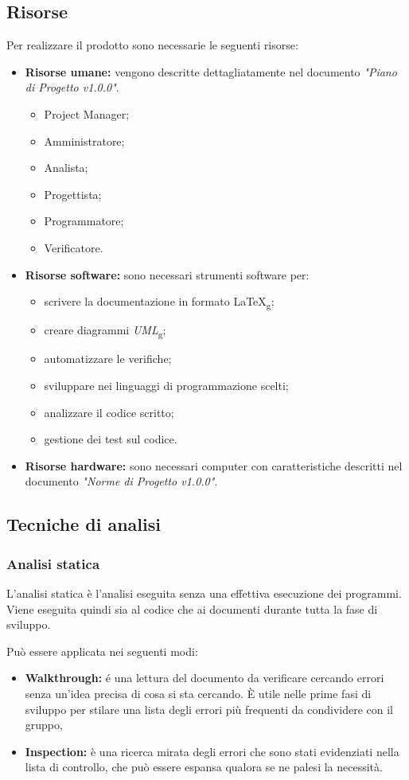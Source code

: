 \documentclass[12pt,a4paper,titlepage]{article}
\begin{document}
	\subsection{Risorse}
	Per realizzare il prodotto sono necessarie le seguenti risorse:
	\begin{itemize}
		\item \textbf{Risorse umane:} vengono descritte dettagliatamente nel documento \textit{"Piano di Progetto v1.0.0"}.
		\begin{itemize}
			\item Project Manager;
			\item Amministratore;
			\item Analista;
			\item Progettista;
			\item Programmatore;
			\item Verificatore.
		\end{itemize}
		\item \textbf{Risorse software:} sono necessari strumenti software per:
		\begin{itemize}
			\item scrivere la documentazione in formato \LaTeX\textsubscript{g};
			\item creare diagrammi \textit{UML}\textsubscript{g};
			\item automatizzare le verifiche;
			\item sviluppare nei linguaggi di programmazione scelti;
			\item analizzare il codice scritto;
			\item gestione dei test sul codice.
		\end{itemize}
		\item \textbf{Risorse hardware:} sono necessari computer con caratteristiche descritti nel documento \textit{"Norme di Progetto v1.0.0"}. 
	\end{itemize}
	\subsection{Tecniche di analisi}
		\subsubsection{Analisi statica}
		L'analisi statica è l'analisi eseguita senza una effettiva esecuzione dei programmi. Viene eseguita quindi sia al codice che ai documenti durante tutta la fase di sviluppo. 
		
		Può essere applicata nei seguenti modi:
		\begin{itemize}
			\item \textbf{Walkthrough:} é una lettura del documento da verificare cercando errori senza un'idea precisa di cosa si sta cercando. È utile nelle prime fasi di sviluppo per stilare una lista degli errori più frequenti da condividere con il gruppo,
			\item \textbf{Inspection:} è una ricerca mirata degli errori che sono stati evidenziati nella lista di controllo, che può essere espansa qualora se ne palesi la necessità.
		\end{itemize}
\end{document}
